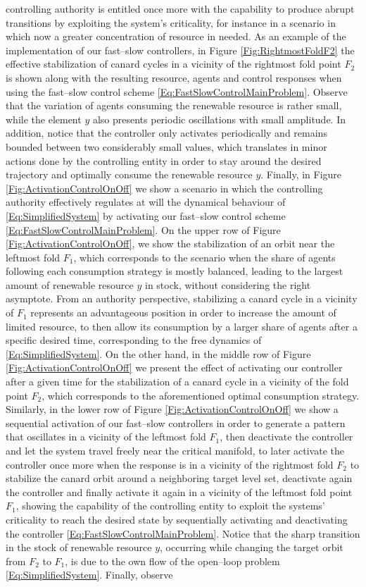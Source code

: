 \documentclass[3p]{elsarticle}
\theoremstyle{plain}
\theoremstyle{remark}
\theoremstyle{definition}
\begin{document}
        controlling authority is entitled once more with the capability to produce abrupt transitions by exploiting the system's criticality, for instance in a scenario in which now a greater concentration of resource in needed. As an example of the implementation of our fast--slow controllers, in Figure \ref{Fig:RightmostFoldF2} the effective stabilization of canard cycles in a vicinity of the rightmost fold point $F_2$ is shown along with the resulting resource, agents and control responses when using the fast--slow control scheme \eqref{Eq:FastSlowControlMainProblem}. Observe that the variation of agents consuming the renewable resource is rather small, while the element $y$ also presents periodic oscillations with small amplitude. In addition, notice that the controller only activates periodically and remains bounded between two considerably small values, which translates in minor actions done by the controlling entity in order to stay around the desired trajectory and optimally consume the renewable resource $y$. Finally, in Figure \ref{Fig:ActivationControlOnOff} we show a scenario in which the controlling authority effectively regulates at will the dynamical behaviour of \eqref{Eq:SimplifiedSystem} by activating our fast--slow control scheme \eqref{Eq:FastSlowControlMainProblem}. On the upper row of Figure \ref{Fig:ActivationControlOnOff}, we show the stabilization of an orbit near the leftmost fold $F_1$, which corresponds to the scenario when the share of agents following each consumption strategy is mostly balanced, leading to the largest amount of renewable resource $y$ in stock, without considering the right asymptote. From an authority perspective, stabilizing a canard cycle in a vicinity of $F_1$ represents an advantageous position in order to increase the amount of limited resource, to then allow its consumption by a larger share of agents after a specific desired time, corresponding to the free dynamics of \eqref{Eq:SimplifiedSystem}. On the other hand, in the middle row of Figure \ref{Fig:ActivationControlOnOff} we present the effect of activating our controller after a given time for the stabilization of a canard cycle in a vicinity of the fold point $F_2$, which corresponds to the aforementioned optimal consumption strategy. Similarly, in the lower row of Figure \ref{Fig:ActivationControlOnOff} we show a sequential activation of our fast--slow controllers in order to generate a pattern that oscillates in a vicinity of the leftmost fold $F_{1}$, then deactivate the controller and let the system travel freely near the critical manifold, to later activate the controller once more when the response is in a vicinity of the rightmost fold $F_{2}$ to stabilize the canard orbit around a neighboring target level set, deactivate again the controller and finally activate it again in a vicinity of the leftmost fold point $F_{1}$, showing the capability of the controlling entity to exploit the systems' criticality to reach the desired state by sequentially activating and deactivating the controller \eqref{Eq:FastSlowControlMainProblem}. Notice that the sharp transition in the stock of renewable resource $y$, occurring while changing the target orbit from $F_{2}$ to $F_{1}$, is due to the own flow of the open--loop problem \eqref{Eq:SimplifiedSystem}. Finally, observe 
\end{document}
